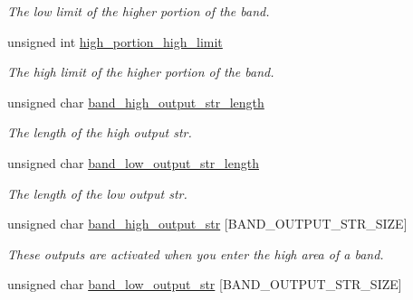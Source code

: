 \begin{CompactItemize}
\begin{CompactList}\small\item\em The low limit of the higher portion of the band. \item\end{CompactList}\item 
\hypertarget{structstruct__band_e7a3d1bf549fce284b2cb4e561766781}{
unsigned int \hyperlink{structstruct__band_e7a3d1bf549fce284b2cb4e561766781}{high\_\-portion\_\-high\_\-limit}}
\label{structstruct__band_e7a3d1bf549fce284b2cb4e561766781}

\begin{CompactList}\small\item\em The high limit of the higher portion of the band. \item\end{CompactList}\item 
\hypertarget{structstruct__band_f688643f9ccb24706166e4eaf79b5544}{
unsigned char \hyperlink{structstruct__band_f688643f9ccb24706166e4eaf79b5544}{band\_\-high\_\-output\_\-str\_\-length}}
\label{structstruct__band_f688643f9ccb24706166e4eaf79b5544}

\begin{CompactList}\small\item\em The length of the high output str. \item\end{CompactList}\item 
\hypertarget{structstruct__band_0b545174b90a4a48f54853b2f7b42a1b}{
unsigned char \hyperlink{structstruct__band_0b545174b90a4a48f54853b2f7b42a1b}{band\_\-low\_\-output\_\-str\_\-length}}
\label{structstruct__band_0b545174b90a4a48f54853b2f7b42a1b}

\begin{CompactList}\small\item\em The length of the low output str. \item\end{CompactList}\item 
\hypertarget{structstruct__band_24999518468ee9a16fb8c33eb6ad6d98}{
unsigned char \hyperlink{structstruct__band_24999518468ee9a16fb8c33eb6ad6d98}{band\_\-high\_\-output\_\-str} \mbox{[}BAND\_\-OUTPUT\_\-STR\_\-SIZE\mbox{]}}
\label{structstruct__band_24999518468ee9a16fb8c33eb6ad6d98}

\begin{CompactList}\small\item\em These outputs are activated when you enter the high area of a band. \item\end{CompactList}\item 
\hypertarget{structstruct__band_010fd732dc84bdf3ba7e4f8424585571}{
unsigned char \hyperlink{structstruct__band_010fd732dc84bdf3ba7e4f8424585571}{band\_\-low\_\-output\_\-str} \mbox{[}BAND\_\-OUTPUT\_\-STR\_\-SIZE\mbox{]}}
\label{structstruct__band_010fd732dc84bdf3ba7e4f8424585571}


\end{CompactItemize}

